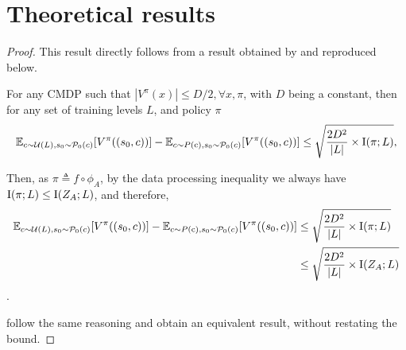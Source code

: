 

\section{Theoretical results}\label{c2:app:proof}
\THGenBound*
\begin{proof}
    This result directly follows from a result obtained by \citet{instance_invariant} and reproduced below.
    \begin{theorem}
For any CMDP such that $|V^\pi (x)| \leq D/2,\forall x, \pi$, with $D$ being a constant, then for any set of training levels $L$, and policy $\pi$
\begin{equation}
    \mathbb{E}_{c\sim \mathcal{U}(L), s_0 \sim \mathcal{P}_0(c)}[V^\pi((s_0,c))] - \mathbb{E}_{c\sim P({\textnormal{c}}), s_0 \sim \mathcal{P}_0(c)}[V^\pi((s_0,c))] \leq \sqrt{\frac{2D^2}{|L|} \times \text{I}(\pi;L)},
\end{equation}
\end{theorem}
Then, as $\pi \triangleq f \circ \phi_A$, by the data processing inequality we always have $\text{I}(\pi;L) \leq \text{I}(Z_A;L)$, and therefore,
\begin{align*}
    \mathbb{E}_{c\sim \mathcal{U}(L), s_0 \sim \mathcal{P}_0(c)}[V^\pi((s_0,c))] - \mathbb{E}_{c\sim P({\textnormal{c}}), s_0 \sim \mathcal{P}_0(c)}[V^\pi((s_0,c))] & \leq \sqrt{\frac{2D^2}{|L|} \times \text{I}(\pi;L)}\\
& \leq \sqrt{\frac{2D^2}{|L|} \times \text{I}(Z_A;L)}
\end{align*}.

\citet{garcin2024dred} follow the same reasoning and obtain an equivalent result, without restating the bound.

\end{proof}

